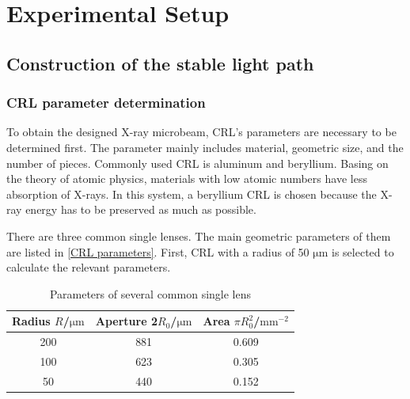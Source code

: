 \documentclass{Head}
\begin{document}
\section{Experimental Setup}
\subsection{Construction of the stable light path}
\subsubsection{CRL parameter determination}
\label{CRL parameter determination}
To obtain the designed X-ray microbeam, CRL's parameters are necessary to be determined first.
The parameter mainly includes material, geometric size, and the number of pieces.
Commonly used CRL is aluminum and beryllium.
Basing on the theory of atomic physics, materials with low atomic numbers have less absorption of X-rays. In this system, a beryllium CRL is chosen because the X-ray energy has to be preserved as much as possible.



There are three common single lenses.
The main geometric parameters of them are listed in \autoref{CRL parameters}.
First, CRL with a radius of 50 $\mathrm{\mu m}$ is selected to calculate the relevant parameters.
\begin{table}
    \centering
    \caption{Parameters of several common single lens}
    \begin{tabular}{ccc}
        \toprule
        Radius $R$/$\mathrm{\mu m}$ & Aperture 2$R_0$/$\mathrm{\mu m}$ & Area $\pi R_0^2$/$\mathrm{mm^{-2}}$ \\
        \midrule
        200                         & 881                              & 0.609                               \\
        100                         & 623                              & 0.305                               \\
        50                          & 440                              & 0.152                               \\
        \bottomrule
    \end{tabular}
    \label{CRL parameters}
\end{table}
\end{document}
